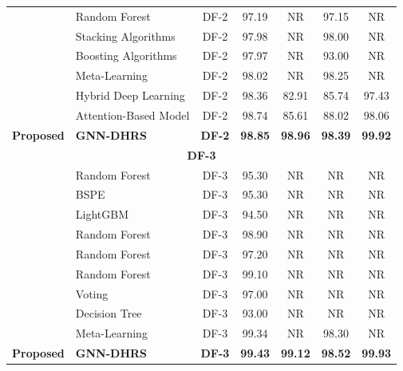 \documentclass[pdflatex,sn-mathphys-num]{sn-jnl}%
\theoremstyle{thmstyleone}%
\theoremstyle{thmstyletwo}%
\theoremstyle{thmstylethree}%
\begin{document}
\begin{table}[!h]
{\begin{tabular}{llccccc}
\cite{df2_hybrid}
& Random Forest
& DF-2
& 97.19 & NR & 97.15 & NR \\

\cite{df1_original}
& Stacking Algorithms
& DF-2
& 97.98 & NR & 98.00 & NR \\

\cite{df2_explainable_ref}
& Boosting Algorithms
& DF-2
& 97.97 & NR & 93.00 & NR \\

\textcolor{red}{\cite{abousaber2025metastroke}}
& Meta-Learning
& DF-2
& 98.02 & NR & 98.25 & NR \\

\cite{akib2025optimizing}
& Hybrid Deep Learning
& DF-2
& 98.36 & 82.91 & 85.74 & 97.43 \\

\cite{kanwal2025stroke}
& Attention-Based Model
& DF-2
& 98.74 & 85.61 & 88.02 & 98.06 \\

\textbf{Proposed}
& \textbf{GNN-DHRS}
& \textbf{DF-2}
& \textbf{98.85}
& \textbf{98.96}
& \textbf{98.39}
& \textbf{99.92} \\

\midrule
\multicolumn{7}{c}{\textbf{DF-3}} \\
\midrule

\cite{df3_ref7}
& Random Forest
& DF-3
& 95.30 & NR & NR & NR \\

\cite{df3_ref8}
& BSPE
& DF-3
& 95.30 & NR & NR & NR \\

\cite{df3_ref9}
& LightGBM
& DF-3
& 94.50 & NR & NR & NR \\

\cite{df3_ref10}
& Random Forest
& DF-3
& 98.90 & NR & NR & NR \\

\cite{df3_ref12}
& Random Forest
& DF-3
& 97.20 & NR & NR & NR \\

\cite{df3_ref14}
& Random Forest
& DF-3
& 99.10 & NR & NR & NR \\

\cite{df3_ref16}
& Voting
& DF-3
& 97.00 & NR & NR & NR \\

\cite{df3_ref17}
& Decision Tree
& DF-3
& 93.00 & NR & NR & NR \\

\textcolor{red}{\cite{abousaber2025metastroke}}
& Meta-Learning
& DF-3
& 99.34 & NR & 98.30 & NR \\

\textbf{Proposed}
& \textbf{GNN-DHRS}
& \textbf{DF-3}
& \textbf{99.43}
& \textbf{99.12}
& \textbf{98.52}
& \textbf{99.93} \\

\bottomrule
\end{tabular}%
}
\end{table}
\end{document}
